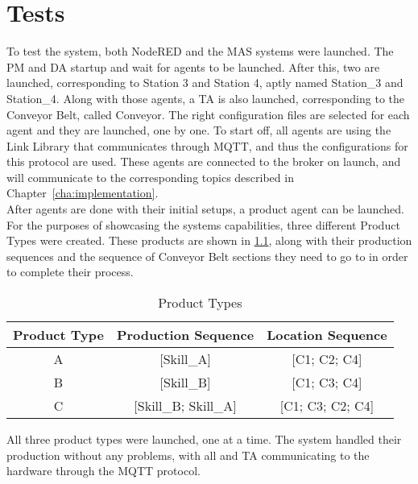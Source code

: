 


\chapter{Tests}
\label{cha:tests}

To test the system, both NodeRED and the \acrshort{MAS} systems were launched. The \acrlong{PM} and \acrlong{DA} startup and wait for agents to be launched. After this, two  are launched, corresponding to Station 3 and Station 4, aptly named Station\_3 and Station\_4. Along with those agents, a \acrlong{TA} is also launched, corresponding to the Conveyor Belt, called Conveyor. The right configuration files are selected for each agent and they are launched, one by one. To start off, all agents are using the Link Library that communicates through \acrshort{MQTT}, and thus the configurations for this protocol are used. These agents are connected to the broker on launch, and will communicate to the corresponding topics described in Chapter~\ref{cha:implementation}.\\

After agents are done with their initial setups, a product agent can be launched. For the purposes of showcasing the systems capabilities, three different Product Types were created. These products are shown in \ref{tab:product_types}, along with their production sequences and the sequence of Conveyor Belt sections they need to go to in order to complete their process.\\

\begin{table}[h!]
	\caption{Product Types}
	\centering
	\begin{tabular}{|c|c|c|}
		\hline
		Product Type & Production Sequence      & Location Sequence    \\ \hline
		A            & {[}Skill\_A{]}           & {[}C1; C2; C4{]}     \\ \hline
		B            & {[}Skill\_B{]}           & {[}C1; C3; C4{]}     \\ \hline
		C            & {[}Skill\_B; Skill\_A{]} & {[}C1; C3; C2; C4{]} \\ \hline
	\end{tabular}
	\label{tab:product_types}
\end{table}

All three product types were launched, one at a time. The system handled their production without any problems, with all  and \acrshort{TA} communicating to the hardware through the \acrshort{MQTT} protocol.\\

